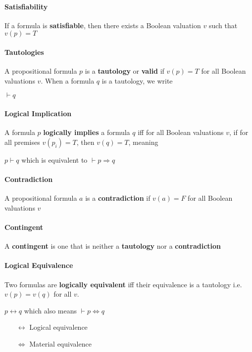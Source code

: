 \documentclass[12pt]{report}
\begin{document}
    \paragraph{Satisfiability} If a formula is \textbf{satisfiable}, then
    there exists a Boolean valuation $v$ such that $v(p) = T$

    \paragraph{Tautologies} A propositional formula $p$ is a
    \textbf{tautology} or \textbf{valid} if $v(p) = T$ for all Boolean
    valuations $v$. When a formula $q$ is a tautology, we write
    \begin{center}
       $\vdash q$
    \end{center}

    \paragraph{Logical Implication} A formula $p$ \textbf{logically
    implies} a formula $q$ iff for all Boolean valuations $v$, if for all
    premises $v(p_i) =
    T$, then $v(q) = T$, meaning
    \begin{center}
      $p \vdash q$ which is equivalent to $\vdash p \Rightarrow q$
    \end{center}

    \paragraph{Contradiction} A propositional formula $a$ is a
    \textbf{contradiction} if $v(a) = F$ for all Boolean valuations $v$

    \paragraph{Contingent} A \textbf{contingent} is one that is neither a
    \textbf{tautology} nor a \textbf{contradiction}

    \paragraph{Logical Equivalence} Two formulas are \textbf{logically
    equivalent} iff their equivalence is a tautology i.e. $v(p) = v(q)$ for
    all $v$.
    \begin{center}
      $p\leftrightarrow q$ which also means $\vdash p \Leftrightarrow q$
    \end{center}
    \begin{itemize}
      \item[$\leftrightarrow$] Logical equivalence
      \item[$\Leftrightarrow$] Material equivalence
    \end{itemize}
\end{document}
